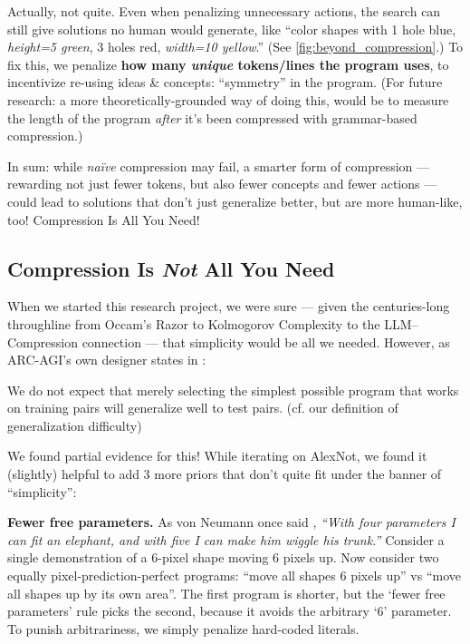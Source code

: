 \documentclass[11pt]{article}
\renewenvironment{quote}
  {\begin{tcolorbox}[enhanced, breakable, sharp corners, frame hidden,
     colback=quotebg, borderline west={3pt}{0pt}{quotebar},
     left=8pt, right=8pt, top=5pt, bottom=5pt,
     before upper={\setlength{\parskip}{0.6em}}]}
  {\end{tcolorbox}}
\begin{document}
Actually, not quite. Even when penalizing unnecessary actions, the search can still give solutions no human would generate, like ``color shapes with 1 hole blue, \textit{height=5 green}, 3 holes red, \textit{width=10 yellow}.'' (See \autoref{fig:beyond_compression}.) To fix this, we penalize \textbf{how many \textit{unique} tokens/lines the program uses}, to incentivize re-using ideas \& concepts: ``symmetry'' in the program. (For future research: a more theoretically-grounded way of doing this, would be to measure the length of the program \textit{after} it's been compressed with grammar-based compression.)

In sum: while \textit{naïve} compression may fail, a smarter form of compression — rewarding not just fewer tokens, but also fewer concepts and fewer actions — could lead to solutions that don't just generalize better, but are more human-like, too! Compression Is All You Need!

\subsection{Compression Is \textit{Not} All You Need}

When we started this research project, we were sure — given the centuries-long throughline from Occam's Razor to Kolmogorov Complexity to the LLM–Compression connection — that simplicity would be all we needed. However, as ARC-AGI's own designer states in \citet{chollet_intelligence_efficiency}:
\begin{quote}
We do not expect that merely selecting the simplest possible program that works on training pairs will generalize well to test pairs. (cf. our definition of generalization difficulty)
\end{quote}
We found partial evidence for this! While iterating on AlexNot, we found it (slightly) helpful to add 3 more priors that don't quite fit under the banner of ``simplicity'':

\textbf{Fewer free parameters.} As von Neumann once said \citep{dyson_fermi_elephant}, \textit{``With four parameters I can fit an elephant, and with five I can make him wiggle his trunk.''} Consider a single demonstration of a 6-pixel shape moving 6 pixels up. Now consider two equally pixel-prediction-perfect programs: ``move all shapes 6 pixels up'' vs ``move all shapes up by its own area''. The first program is shorter, but the `fewer free parameters' rule picks the second, because it avoids the arbitrary `6' parameter. To punish arbitrariness, we simply penalize hard-coded literals.
\end{document}
